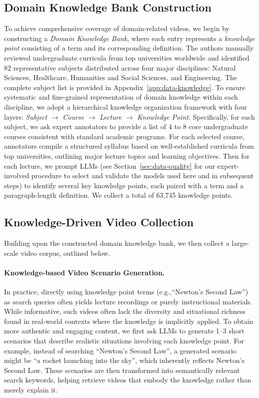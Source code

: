 \documentclass{llmxive}
\providecommand{\eg}{e.g.,\xspace}
\providecommand{\numknow}{63,745\xspace}
\begin{document}
\subsection{Domain Knowledge Bank Construction}
\label{sec:31}
To achieve comprehensive coverage of domain-related videos, we begin by constructing a \emph{Domain Knowledge Bank}, where each entry represents a \emph{knowledge point} consisting of a term and its corresponding definition. 
The authors manually reviewed undergraduate curricula from top universities worldwide and identified 82 representative subjects distributed across four major disciplines: Natural Sciences, Healthcare, Humanities and Social Sciences, and Engineering. The complete subject list is provided in Appendix~\ref{app:data-knowledge}.
To ensure systematic and fine-grained representation of domain knowledge within each discipline, we adopt a hierarchical knowledge organization framework with four layers: \textit{Subject} $\rightarrow$ \textit{Course} $\rightarrow$ \textit{Lecture} $\rightarrow$ \textit{Knowledge Point}.
Specifically, for each subject, we ask expert annotators to provide a list of 4 to 8 core undergraduate courses consistent with standard academic programs. For each selected course, annotators compile a structured syllabus based on well-established curricula from top universities, outlining major lecture topics and learning objectives. Then for each lecture, we prompt LLMs (see Section~\ref{sec:data-quality} for our expert-involved procedure to select and validate the models used here and in subsequent steps) to identify several key knowledge points, each paired with a term and a paragraph-length definition.
We collect a total of \numknow knowledge points.

\subsection{Knowledge-Driven Video Collection}
Building upon the constructed domain knowledge bank, we then collect a large-scale video corpus, outlined below.

\vspace{-8pt}
\paragraph{Knowledge-based Video Scenario Generation.} In practice, directly using knowledge point terms (\eg ``Newton’s Second Law'') as search queries often yields lecture recordings or purely instructional materials.
While informative, such videos often lack the diversity and situational richness found in real-world contexts where the knowledge is implicitly applied. To obtain more authentic and engaging content, we first ask LLMs to generate 1–3 short scenarios that describe realistic situations involving each knowledge point. For example, instead of searching ``Newton’s Second Law'', a generated scenario might be ``a rocket launching into the sky'', which inherently reflects Newton’s Second Law.
These scenarios are then transformed into semantically relevant search keywords, helping retrieve videos that embody the knowledge rather than merely explain it.
\end{document}
